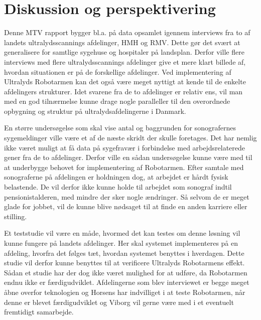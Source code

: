 \chapter{Diskussion og perspektivering}

Denne MTV rapport bygger bl.a. på data opsamlet igennem interviews fra to af landets ultralydsscannings afdelinger, HMH og RMV. Dette gør det svært at generalisere for samtlige sygehuse og hospitaler på landsplan. Derfor ville flere interviews med flere ultralydsscannings afdelinger give et mere klart billede af, hvordan situationen er på de forskellige afdelinger. Ved implementering af Ultralyds Robotarmen kan det også være meget nyttigt at kende til de enkelte afdelingers strukturer. 
Idet svarene fra de to afdelinger er relativ ens, vil man med en god tilnærmelse kunne drage nogle paralleller til den overordnede opbygning og struktur på ultralydsafdelingerne i Danmark.

En større undersøgelse som skal vise antal og baggrunden for sonografernes sygemeldinger ville være et af de næste skridt der skulle foretages. Det har nemlig ikke været muligt at få data på sygefravær i forbindelse med arbejdsrelaterede gener fra de to afdelinger. Derfor ville en sådan undersøgelse kunne være med til at underbygge behovet for implementering af Robotarmen.
Efter samtale med sonograferne på afdelingen er holdningen dog, at arbejdet er hårdt fysisk belastende.  De vil derfor ikke kunne holde til arbejdet som sonograf indtil pensionistalderen, med mindre der sker nogle ændringer. Så selvom de er meget glade for jobbet, vil de kunne blive nødsaget til at finde en anden karriere eller stilling. 


Et teststudie vil være en måde, hvormed det kan testes om denne løsning vil kunne fungere på landets afdelinger. Her skal systemet implementeres på en afdeling, hvorfra det følges tæt, hvordan systemet benyttes i hverdagen. Dette studie vil derfor kunne benyttes til at verificere Ultralyds Robotarmens effekt. Sådan et studie har der dog ikke været mulighed for at udføre, da Robotarmen endnu ikke er færdigudviklet. 
Afdelingerne som blev interviewet er begge meget åbne overfor teknologien og Horsens har indvilliget i at teste Robotarmen, når denne er blevet færdigudviklet og Viborg vil gerne være med i et eventuelt fremtidigt samarbejde. 

